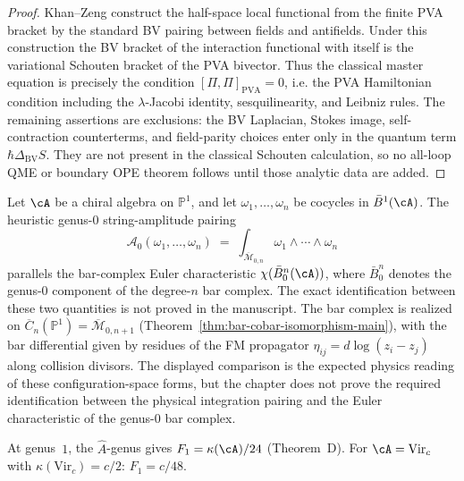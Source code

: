 \begin{proof}
Khan--Zeng construct the half-space local functional from the finite
PVA bracket by the standard BV pairing between fields and antifields.
Under this construction the BV bracket of the interaction functional
with itself is the variational Schouten bracket of the PVA bivector.
Thus the classical master equation is precisely the condition
$[\Pi,\Pi]_{\mathrm{PVA}}=0$, i.e. the PVA Hamiltonian condition
including the $\lambda$-Jacobi identity, sesquilinearity, and Leibniz
rules.  The remaining assertions are exclusions: the BV Laplacian,
Stokes image, self-contraction counterterms, and field-parity choices
enter only in the quantum term
$\hbar\Delta_{\mathrm{BV}}S$.  They are not present in the classical
Schouten calculation, so no all-loop QME or boundary OPE theorem
follows until those analytic data are added.
\end{proof}

\label{subsec:bv-bar-identification}

\begin{remark}\label{rem:genus0-amplitude-bar}
Let $\cA$ be a chiral algebra on $\mathbb{P}^1$, and let
$\omega_1, \ldots, \omega_n$ be cocycles in
$\bar{B}^1(\cA)$. The heuristic genus-$0$ string-amplitude pairing
\[
\mathcal{A}_0(\omega_1, \ldots, \omega_n)
\;=\;
\int_{\overline{\mathcal{M}}_{0,n}}
 \omega_1 \wedge \cdots \wedge \omega_n
\]
parallels the bar-complex Euler characteristic
$\chi(\bar{B}^n_0(\cA))$, where $\bar{B}^n_0$ denotes the
genus-$0$ component of the degree-$n$ bar complex. The exact
identification between these two quantities is not proved in the
manuscript.
The bar complex is realized on
$\overline{C}_n(\mathbb{P}^1) = \overline{\mathcal{M}}_{0,n+1}$
(Theorem~\ref{thm:bar-cobar-isomorphism-main}),
with the bar differential given by residues of the FM propagator
$\eta_{ij} = d\log(z_i - z_j)$ along collision divisors.
The displayed comparison is the expected physics reading of these
configuration-space forms, but the chapter does not prove the required
identification between the physical integration pairing and the Euler
characteristic of the genus-$0$ bar complex.
\end{remark}

\begin{remark}\label{rem:genus1-bv}
At genus~$1$, the $\hat{A}$-genus gives $F_1 = \kappa(\cA)/24$
\textup{(}Theorem~D\textup{)}. For $\cA = \mathrm{Vir}_c$ with
$\kappa(\mathrm{Vir}_c) = c/2$: $F_1 = c/48$.
\end{remark}

